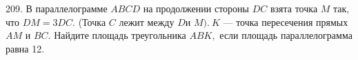 209. В параллелограмме $ABCD$ на продолжении стороны $DC$ взята точка $M$ так, что $DM=3DC.$ (Точка $C$
лежит между $D$и $M).\ K$ --- точка пересечения прямых $AM$ и $BC.$ Найдите площадь треугольника $ABK,$ если
площадь параллелограмма равна 12.\\
